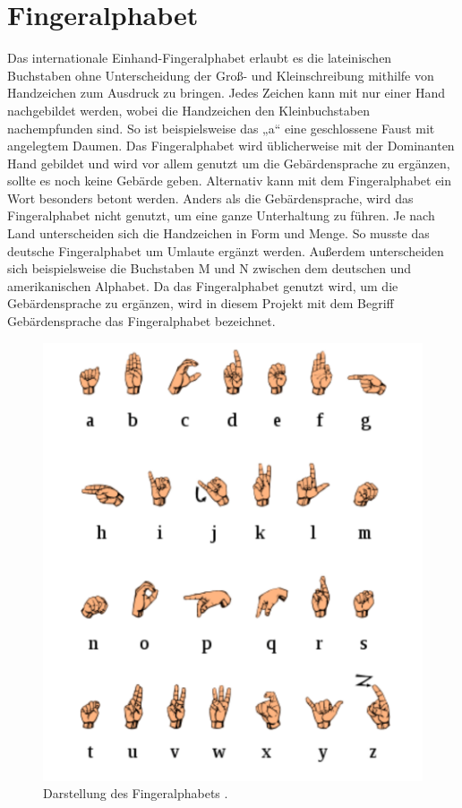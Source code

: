 \documentclass[11pt,bibliography=totocnumbered]{scrartcl}
\begin{document}
\section{Fingeralphabet}
\label{fingeralphabet}
Das internationale Einhand-Fingeralphabet erlaubt es die lateinischen Buchstaben ohne Unterscheidung der Groß- und Kleinschreibung mithilfe von Handzeichen zum Ausdruck zu bringen. Jedes Zeichen kann mit nur einer Hand nachgebildet werden, wobei die Handzeichen den Kleinbuchstaben nachempfunden sind. So ist beispielsweise das „a“ eine geschlossene Faust mit angelegtem Daumen. Das Fingeralphabet wird üblicherweise mit der Dominanten Hand gebildet und wird vor allem genutzt um die Gebärdensprache zu ergänzen, sollte es noch keine Gebärde geben. Alternativ kann mit dem Fingeralphabet ein Wort besonders betont werden. Anders als die Gebärdensprache, wird das Fingeralphabet nicht genutzt, um eine ganze Unterhaltung zu führen.  Je nach Land unterscheiden sich die Handzeichen in Form und Menge. So musste das deutsche Fingeralphabet um Umlaute ergänzt werden. Außerdem unterscheiden sich beispielsweise die Buchstaben M und N zwischen dem deutschen und amerikanischen Alphabet. Da das Fingeralphabet genutzt wird, um die Gebärdensprache zu ergänzen, wird in diesem Projekt mit dem Begriff Gebärdensprache das Fingeralphabet bezeichnet.
\begin{figure}[H] 
	\centering
	\includegraphics[width=1.0\textwidth]{fingeralphabet}
	\caption[Fingeralphabet]{Darstellung des Fingeralphabets \cite{FINGERALPHABET}.}
	\label{fig:fingeralphabet}
\end{figure}
\end{document}
